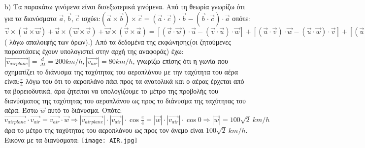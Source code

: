 \documentclass{article}
\begin{document}
\newline
b) Τα παρακάτω γινόμενα είναι δισεξωτερικά γινόμενα. Από τη θεωρία γνωρίζω ότι για τα διανύσματα $\vec{a},\vec{b},\vec{c}$ ισχύει:$(\vec{a}\times\vec{b})\times\vec{c}=(\vec{a}\cdot\vec{c})\cdot\vec{b} - (\vec{b}\cdot\vec{c})\cdot\vec{a}$ οπότε:\newline
$\vec{v}\times(\vec{u}\times\vec{w}) + \vec{u}\times(\vec{w}\times\vec{v}) + \vec{w}\times(\vec{v}\times\vec{u})=[(\vec{v}\cdot\vec{w})\cdot\vec{u} - (\vec{v}\cdot\vec{u})\cdot\vec{w}] + [(\vec{u}\cdot\vec{v})\cdot\vec{w} - (\vec{u}\cdot\vec{w})\cdot\vec{v}] + [(\vec{u}\cdot\vec{w})\cdot\vec{v} - (\vec{w}\cdot\vec{v})\cdot\vec{u}]=0$( λόγω απαλοιφής των όρων).)\newline
Από τα δεδομένα της εκφώνησης(οι ζητούμενες παραστάσεις έχουν υπολογιστεί στην αρχή της αναφοράς) έχω: \newline
$|\vec{v_{airplane}}|=\frac{d}{Δt}=200 km/h ,|\vec{v_{air}}|=80 km/h$, γνωρίζω επίσης ότι η γωνία που σχηματίζει το διάνυσμα της ταχύτητας του αεροπλάνου με την ταχύτητα του αέρα είναι:$\frac{\pi}{4}$ λόγω του ότι το αεροπλάνο πάει προς τα ανατολικά και ο αέρας έρχεται από τα βορειοδυτικά, άρα ζητείται να υπολογίζουμε το μέτρο της προβολής του διανύσματος της ταχύτητας του αεροπλάνου ως προς το διάνυσμα της ταχύτητας του αέρα. Έστω $\vec{w}$ αυτό το διάνυσμα.  Οπότε:\newline
$\vec{v_{airplane}}\cdot\vec{v_{air}}=\vec{v_{air}}\cdot\vec{w} \Rightarrow |\vec{v_{airplane}}|\cdot|\vec{v_{air}}|\cdot\cos{\frac{\pi}{4}}=|\vec{w}|\cdot|\vec{v_{air}}|\cdot\cos{0} \Rightarrow |\vec{w}|=100\sqrt2\:km/h$ άρα το μέτρο της ταχύτητας του αεροπλάνου ως προς τον άνεμο είναι $100\sqrt2\:km/h$.\newline
Εικόνα με τα διανύσματα:\newline
\texttt{[image: AIR.jpg]} \newline
\end{document}
